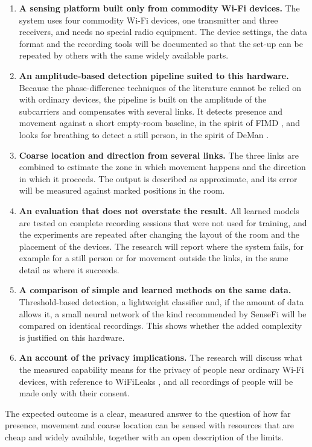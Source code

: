 \begin{enumerate}
  \item \textbf{A sensing platform built only from commodity Wi-Fi devices.} The system uses four commodity Wi-Fi devices, one transmitter and three receivers, and needs no special radio equipment. The device settings, the data format and the recording tools will be documented so that the set-up can be repeated by others with the same widely available parts.
  \item \textbf{An amplitude-based detection pipeline suited to this hardware.} Because the phase-difference techniques of the literature cannot be relied on with ordinary devices, the pipeline is built on the amplitude of the subcarriers and compensates with several links. It detects presence and movement against a short empty-room baseline, in the spirit of FIMD \cite{fimd}, and looks for breathing to detect a still person, in the spirit of DeMan \cite{deman}.
  \item \textbf{Coarse location and direction from several links.} The three links are combined to estimate the zone in which movement happens and the direction in which it proceeds. The output is described as approximate, and its error will be measured against marked positions in the room.
  \item \textbf{An evaluation that does not overstate the result.} All learned models are tested on complete recording sessions that were not used for training, and the experiments are repeated after changing the layout of the room and the placement of the devices. The research will report where the system fails, for example for a still person or for movement outside the links, in the same detail as where it succeeds.
  \item \textbf{A comparison of simple and learned methods on the same data.} Threshold-based detection, a lightweight classifier and, if the amount of data allows it, a small neural network of the kind recommended by SenseFi \cite{sensefi} will be compared on identical recordings. This shows whether the added complexity is justified on this hardware.
  \item \textbf{An account of the privacy implications.} The research will discuss what the measured capability means for the privacy of people near ordinary Wi-Fi devices, with reference to WiFiLeaks \cite{wifileaks}, and all recordings of people will be made only with their consent.
\end{enumerate}

The expected outcome is a clear, measured answer to the question of how far presence, movement and coarse location can be sensed with resources that are cheap and widely available, together with an open description of the limits.
